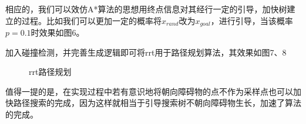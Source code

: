 \documentclass[12pt]{article}
\begin{document}
    相应的，我们可以效仿A*算法的思想用终点信息对其经行一定的引导，加快树建立的过程。比如我们可以更加一定的概率将$x_{rand}$改为$x_{goal}$，进行引导，当该概率$p=0.1$时效果如图6。

    加入碰撞检测，并完善生成逻辑即可将rrt用于路径规划算法，其效果如图7、8
    \begin{figure}[htbp]
        \centering
        \caption{ rrt路径规划}
    \end{figure}

    值得一提的是，在实现过程中若有意识地将朝向障碍物的点不作为采样点也可以加快路径搜索的完成，因为这样就相当于引导搜索树不朝向障碍物生长，加速了算法的完成。
\end{document}
